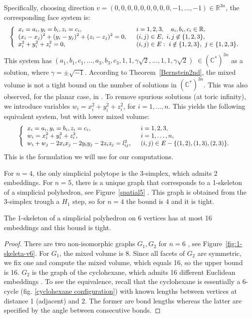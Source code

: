 \documentclass[envcountsame]{llncs}
\def\CC{{\mathbb C}} \def\NN{{\mathbb N}} \def\RR{{\mathbb R}}
\begin{document}
Specifically, choosing direction  $v=(0,0,0,0,0,0,0,0,0,-1,\ldots,-1)\in \mathbb{R}^{3n}$, the corresponding  face system is:
\begin{equation*} \small \left\{ \begin{array}{ll}
      x_i=a_i, y_i=b_i, z_i=c_i,&i=1,2,3 , \quad a_i,b_i,c_i\in\RR , \\
      (x_i-x_j)^2+(y_i-y_j)^2+(z_i-z_j)^2=0, \;\; & (i,j) \in E,\ i,j \not\in\{ 1,2,3 \},\\
      x_i^2+y_i^2+z_i^2=0,& (i,j) \in E:\ i \notin\{1,2,3\},\ j \in \{1,2,3\}.
    \end{array}\right.  \label{system}
\end{equation*}
This system has
$(a_1,b_1,c_1,\ldots, a_3,b_3,c_3, 1,1,\gamma\sqrt{2},\ldots, 1,1,\gamma\sqrt{2})$
$\in(\CC^*)^{3n}$ as a solution, where $\gamma=\pm\sqrt{-1}$.
According to Theorem~\ref{Bernstein2nd}, the mixed volume is not
a tight bound on the number of solutions in $(\CC^*)^{3n}$.
This was also observed, for the planar case, in \cite{ST08}.
To remove spurious solutions (at toric infinity),
we introduce variables $w_i=x_i^2+y_i^2+z_i^2$, for $i=1,\ldots,n$.
This yields the following equivalent system, but with lower mixed volume:
\begin{equation}\label{Enewsys} \small \left\{ \begin{array}{ll}
    x_i=a_i, y_i=b_i, z_i=c_i,&  i=1,2,3 , \\
    w_i = x_i^2 + y_i^2 + z_i^2,&  i=1,\ldots,n, \\
    w_i+w_j-2x_ix_j-2y_iy_j-2z_iz_j = l_{ij}^2, \;\; & (i,j)\in E-\{(1,2),(1,3),(2,3)\}.
  \end{array} \right.
\end{equation}
This is the formulation we will use for our computations.


For $n=4$, the only simplicial polytope is the 3-simplex, which 
admits 2 embeddings.  
For $n=5$, there is a unique graph that corresponds to a  1-skeleton of a simplicial polyhedron, see Figure~\ref{spatial5}
\cite{BF67}.
This graph is obtained from the 3-simplex trough a $H_1$ step, so for $n=4$ the bound is 4 and it is tight.

\begin{theorem}\label{16embeddings}
  The 1-skeleton of a simplicial polyhedron on 6 vertices has at most 16     embeddings
  and this bound is tight.
\end{theorem}
  
  \begin{proof}
  There are two non-isomorphic graphs $G_1,G_2$ for $n=6$ \cite{BF67},
  see Figure~\ref{fig:1-skeleta-v6}.
For $G_1$, the mixed volume is 8.
Since all facets of $G_2$ are symmetric, we fix one and compute the
mixed volume, which equals 16, so the upper bound is 16.
$G_2$ is the graph of the cyclohexane, which admits 16 different 
Euclidean embeddings \cite{EM99}.
To see the equivalence, recall that the cyclohexane is essentially a 6-cycle
(fig. \ref{cyclohexane configuration})
with known lengths between vertices at distance 1 (adjacent) and 2.
The former are bond lengths whereas the latter are specified
by the angle between consecutive bonds.\end{proof}
 
\end{document}
